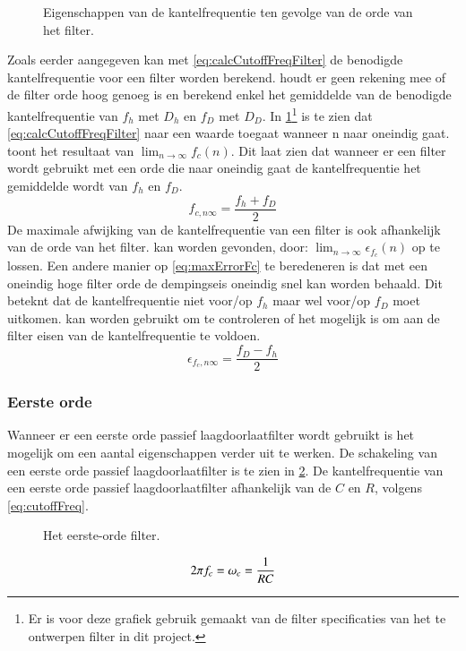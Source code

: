 \begin{figure}[!htbp]
    \centering
    
    \caption{Eigenschappen van de kantelfrequentie ten gevolge van de orde van het filter.}
    \label{fig:fcEigenschappenTengevolgeVanN}
\end{figure}
Zoals eerder aangegeven kan met \cref{eq:calcCutoffFreqFilter} de benodigde kantelfrequentie voor een filter worden berekend.  houdt er geen rekening mee of de filter orde hoog genoeg is en berekend enkel het gemiddelde van de benodigde kantelfrequentie van $f_h$ met $D_h$ en $f_D$ met $D_D$. In \cref{fig:fcEigenschappenTengevolgeVanN}\footnote{Er is voor deze grafiek gebruik gemaakt van de filter specificaties van het te ontwerpen filter in dit project.} is te zien dat \cref{eq:calcCutoffFreqFilter} naar een waarde toegaat wanneer n naar oneindig gaat.  toont het resultaat van $\lim_{n\rightarrow\infty}f_c\left(n\right)$. Dit laat zien dat wanneer er een filter wordt gebruikt met een orde die naar oneindig gaat de kantelfrequentie het gemiddelde wordt van $f_h$ en $f_D$.
\begin{equation}\label{eq:limietCutoffFreqNtoInfty}
    f_{c,n\infty}=\frac{f_h+f_D}{2}
\end{equation}
De maximale afwijking van de kantelfrequentie van een filter is ook afhankelijk van de orde van het filter.  kan worden gevonden, door: $\lim_{n\rightarrow\infty}\epsilon_{f_c}\left(n\right)$ op te lossen. Een andere manier op \cref{eq:maxErrorFc} te beredeneren is dat met een oneindig hoge filter orde de dempingseis oneindig snel kan worden behaald. Dit beteknt dat de kantelfrequentie niet voor/op $f_h$ maar wel voor/op $f_D$ moet uitkomen.  kan worden gebruikt om te controleren of het mogelijk is om aan de filter eisen van de kantelfrequentie te voldoen.
\begin{equation}\label{eq:maxErrorFc}
    \epsilon_{f_c,n\infty}=\frac{f_D-f_h}{2}
\end{equation}



\subsubsection{Eerste orde}
Wanneer er een eerste orde passief laagdoorlaatfilter wordt gebruikt is het mogelijk om een aantal eigenschappen verder uit te werken.
De schakeling van een eerste orde passief laagdoorlaatfilter is te zien in \cref{fig:filterCircuit}. De kantelfrequentie van een eerste orde passief laagdoorlaatfilter afhankelijk van de $C$ en $R$, volgens \cref{eq:cutoffFreq}.
\begin{figure}[ht]
    \centering
    \def\svgwidth{0.3\textwidth}
    
    \caption{Het eerste-orde filter.}
    \label{fig:filterCircuit}
\end{figure}
\begin{equation} \label{eq:cutoffFreq}
    2\pi f_c = \omega_c = \frac{1}{RC}
    \tagaddtext{[\si{\radian\per\second}]}
\end{equation}


